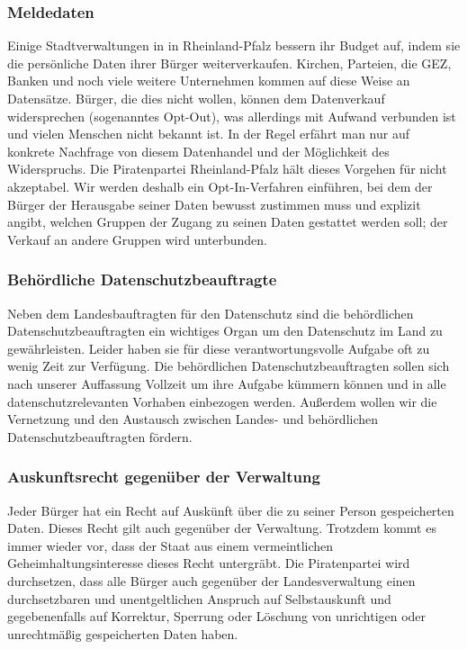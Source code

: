\subsubsection{Meldedaten}
\abstimmung
Einige Stadtverwaltungen in in Rheinland-Pfalz bessern ihr Budget auf, indem sie die persönliche Daten ihrer Bürger weiterverkaufen. Kirchen, Parteien, die GEZ, Banken und noch viele weitere Unternehmen kommen auf diese Weise an Datensätze. Bürger, die dies nicht wollen, können dem Datenverkauf widersprechen (sogenanntes Opt-Out), was allerdings mit Aufwand verbunden ist und vielen Menschen nicht bekannt ist. In der Regel erfährt man nur auf konkrete Nachfrage von diesem Datenhandel und der Möglichkeit des Widerspruchs. Die Piratenpartei Rheinland-Pfalz hält dieses Vorgehen für nicht akzeptabel. Wir werden deshalb ein Opt-In-Verfahren einführen, bei dem der Bürger der Herausgabe seiner Daten bewusst zustimmen muss und explizit angibt, welchen Gruppen der Zugang zu seinen Daten gestattet werden soll; der Verkauf an andere Gruppen wird unterbunden.

\subsubsection{Behördliche Datenschutzbeauftragte}
\abstimmung
Neben dem Landesbauftragten für den Datenschutz sind die behördlichen Datenschutzbeauftragten ein wichtiges Organ um den Datenschutz im Land zu gewährleisten. Leider haben sie für diese verantwortungsvolle Aufgabe oft zu wenig Zeit zur Verfügung. Die behördlichen Datenschutzbeauftragten sollen sich nach unserer Auffassung Vollzeit um ihre Aufgabe kümmern können und in alle datenschutzrelevanten Vorhaben einbezogen werden. Außerdem wollen wir die Vernetzung und den Austausch zwischen Landes- und behördlichen Datenschutzbeauftragten fördern.

\subsubsection{Auskunftsrecht gegenüber der Verwaltung}
\abstimmung
Jeder Bürger hat ein Recht auf Auskünft über die zu seiner Person gespeicherten Daten. Dieses Recht gilt auch gegenüber der Verwaltung. Trotzdem kommt es immer wieder vor, dass der Staat aus einem vermeintlichen Geheimhaltungsinteresse dieses Recht untergräbt. Die Piratenpartei wird durchsetzen, dass alle Bürger auch gegenüber der Landesverwaltung einen durchsetzbaren und unentgeltlichen Anspruch auf Selbstauskunft und gegebenenfalls auf Korrektur, Sperrung oder Löschung von unrichtigen oder unrechtmäßig gespeicherten Daten haben.

